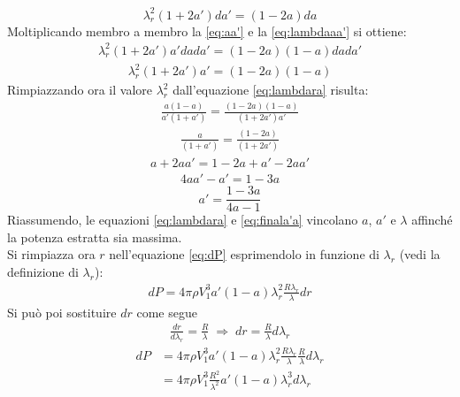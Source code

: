 \begin{equation}\label{eq:lambdaaa'}
\lambda_r^2 \left( 1+ 2a' \right) da' = \left( 1 - 2a \right)da
\end{equation}
Moltiplicando membro a membro la \ref{eq:aa'} e la \ref{eq:lambdaaa'} si ottiene:
\begin{align*}
\lambda_r^2 \left( 1 + 2a' \right) a' da da' = \left( 1 - 2a \right) \left( 1-a \right) da da'
\end{align*}
\begin{align*}
\lambda_r^2 \left( 1 + 2a' \right) a' = \left( 1- 2a \right) \left(1 -a \right)
\end{align*}
Rimpiazzando ora il valore $\lambda_r^2$ dall'equazione \ref{eq:lambdara} risulta:
\begin{align*}
\frac{a \left(1 - a \right)}{a' \left(1 + a' \right)} = \frac{\left( 1 - 2a \right) \left( 1 -a \right)}{\left(1 + 2a' \right) a'}
\end{align*}
\begin{align*}
\frac{a}{\left( 1 + a' \right)} = \frac{\left( 1 - 2a \right)}{\left( 1 + 2a' \right)}
\end{align*}
\begin{align*}
a + 2 a a' = 1 - 2a + a' - 2aa'
\end{align*}
\begin{align*}
4aa' -a' = 1 - 3a
\end{align*}
\begin{equation}\label{eq:finala'a}
a' = \frac{1 - 3a}{4a -1}
\end{equation}
Riassumendo, le equazioni \ref{eq:lambdara} e \ref{eq:finala'a} vincolano $a$, $a'$ e $\lambda$ affinché la potenza estratta sia massima.\\
Si rimpiazza ora $r$ nell'equazione \ref{eq:dP} esprimendolo in funzione di $\lambda_r$ (vedi la definizione di $\lambda_r$):
\begin{align*}
dP = 4 \pi \rho V_1^3 a' \left( 1 - a \right) \lambda_r^2 \frac{R \lambda_r}{\lambda} dr
\end{align*}
Si può poi sostituire $dr$ come segue
\begin{align*}
\frac{dr}{d \lambda_r} = \frac{R}{\lambda} \; \Rightarrow \; dr = \frac{R}{\lambda} d \lambda_r
\end{align*}
\begin{align*}
dP &= 4 \pi \rho V_1^3 a' \left(1 - a \right) \lambda_r^2 \frac{R \lambda_r}{\lambda} \frac{R}{\lambda} d \lambda_r\\
&= 4 \pi \rho V_1^3 \frac{R^2}{\lambda^2} a' \left( 1 - a \right) \lambda_r^3 d\lambda_r
\end{align*}
